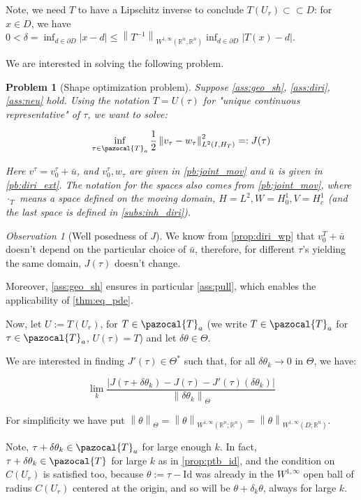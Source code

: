 \documentclass[english,a4paper,12pt,oneside]{scrbook}
\theoremstyle{break}
\newtheorem{pb}[equation]{Problem}
\theoremstyle{remark}
\newtheorem{obs}[equation]{Observation}
\newcommand{\mR}{\mathbb{R}}
\newcommand{\norm}[1]{\left\lVert#1\right\rVert}
\newcommand{\cc}{\subset\subset}
\newcommand{\cT}{\pazocal{T}}
\newcommand{\id}{\text{Id}}
\newcommand{\te}{\theta}
\newcommand{\Te}{\Theta}
\begin{document}
Note, we need $T$ to have a Lipschitz inverse to conclude $T(U_r)\cc D$: for $x \in D$, we have $0<\delta = \inf_{d \in \partial D}|x-d|\leq \norm{T^{-1}}_{W^{1,\infty}(\mR^n,\mR^n)}\inf_{d \in \partial D}|T(x)-d|$.

We are interested in solving the following problem.

\begin{pb}[Shape optimization problem]
\label{pb:shopt}
Suppose \cref{ass:geo_sh}, \cref{ass:diri}, \cref{ass:neu} hold. Using the notation $T = U(\tau)$ for "unique continuous representative" of $\tau$, we want to solve:

$$\inf_{\tau \in \cT_a}\frac{1}{2}\norm{v_\tau-w_\tau}_{L^2(I,H_T)}^2=:J(\tau)$$

Here $v^\tau = v_0^\tau + \bar{u}$, and $v_0^\tau, w_\tau$ are given in \cref{pb:joint_mov} and $\bar{u}$ is given in \cref{pb:diri_ext}. The notation for the spaces also comes from  \cref{pb:joint_mov}, where $\cdot_T$ means a space defined on the moving domain, $H=L^2, W=H^1_0, V = H^1_c$ (and the last space is defined in \cref{subs:inh_diri}).

\end{pb}

\begin{obs}[Well posedness of $J$]

We know from \cref{prop:diri_wp} that $v_0^T + \bar{u}$ doesn't depend on the particular choice of $\bar{u}$, therefore, for different $\tau$'s yielding the same domain, $J(\tau)$ doesn't change.

\end{obs}

Moreover, \cref{ass:geo_sh} ensures in particular \cref{ass:pull}, which enables the applicability of \cref{thm:eq_pde}.

Now, let $U:=T(U_r)$, for $T \in \cT_a$ (we write $T \in \cT_a$ for $\tau \in \cT_a$, $U(\tau)=T$) and let $\delta \te \in \Te$. 

We are interested in finding $J'(\tau) \in \Te^*$ such that, for all $\delta \te_k \rightarrow 0$ in $\Te$, we have:


$$\lim_{k}\frac{|J(\tau+\delta \te_k)-J(\tau)-J'(\tau)(\delta \te_k)|}{\norm{\delta \te_k}_{\Te}}$$

For simplificity we have put $\norm{\te}_\Te = \norm{\te}_{W^{1,\infty}(\mR^n;\mR^n)}=\norm{\te}_{W^{1,\infty}(D;\mR^n)}$.

Note, $\tau+\delta \te_k \in \cT_a$ for large enough $k$. In fact, $\tau+\delta \te_k \in \cT$ for large $k$ as in \cref{prop:ptb_id}, and the condition on $C(U_r)$ is satisfied too, because $\te :=\tau-\id$ was already in the $W^{1,\infty}$ open ball of radius $C(U_r)$ centered at the origin, and so will be $\te + \delta_k\te$, always for large $k$.
\end{document}
